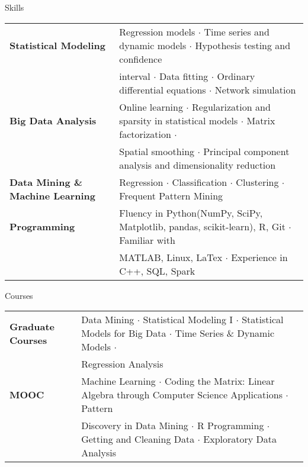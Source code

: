 \documentclass{my_resume} %
\begin{document}
\begin{rSection}{Skills}

\begin{tabular}{ @{} >{\bfseries}l @{\hspace{6ex}} l }
  Statistical Modeling & Regression models {$\cdot$} Time series and
  dynamic models {$\cdot$} Hypothesis testing and confidence \\
  & interval {$\cdot$} Data fitting {$\cdot$} Ordinary differential
  equations {$\cdot$} Network simulation\\
  Big Data Analysis & Online learning {$\cdot$} Regularization and sparsity in
  statistical models {$\cdot$} Matrix factorization {$\cdot$}\\
  & Spatial smoothing {$\cdot$} Principal component analysis and
  dimensionality reduction\\
  Data Mining \& Machine Learning & Regression {$\cdot$} Classification
  {$\cdot$} Clustering {$\cdot$} Frequent Pattern Mining\\
  Programming & Fluency in Python(NumPy, SciPy, Matplotlib, pandas,
  scikit-learn), R, Git {$\cdot$} Familiar with \\
  & MATLAB, Linux, LaTex {$\cdot$} Experience in C++, SQL, Spark\\
\end{tabular}
\end{rSection}


\begin{rSection}{Courses}

\begin{tabular}{ @{} >{\bfseries}l @{\hspace{6ex}} l }
  Graduate Courses & Data Mining {$\cdot$} Statistical Modeling I
  {$\cdot$} Statistical Models for Big Data {$\cdot$} Time Series \&
  Dynamic Models {$\cdot$} \\
  & Regression Analysis\\
  MOOC & Machine Learning {$\cdot$} Coding the Matrix: Linear Algebra through Computer
  Science Applications {$\cdot$} Pattern \\
  & Discovery in Data Mining {$\cdot$} R Programming {$\cdot$}
  Getting and Cleaning Data {$\cdot$} Exploratory Data Analysis\\
\end{tabular}
\end{rSection}
\end{document}
